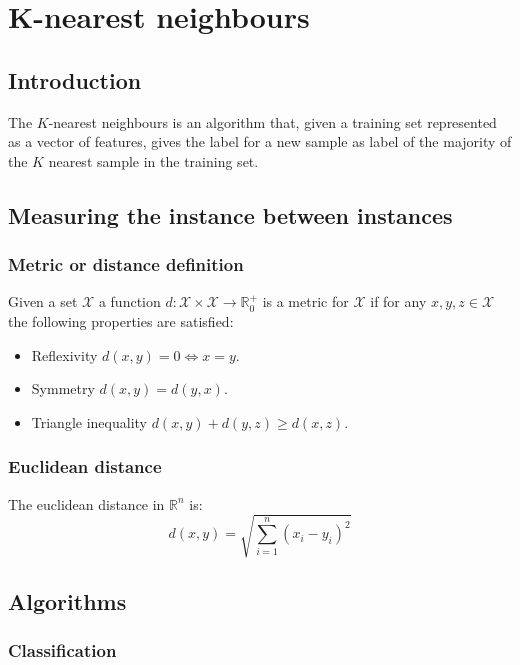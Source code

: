 \chapter{K-nearest neighbours}

\section{Introduction}
The $K$-nearest neighbours is an algorithm that, given a training set represented as a vector of features, gives the label for a new sample as label of the majority of the $K$ nearest sample in the training set.

\section{Measuring the instance between instances}

	\subsection{Metric or distance definition}
Given a set $\mathcal{X}$ a function $d:\mathcal{X}\times\mathcal{X}\rightarrow\mathbb{R}^{+}_0$ is a metric for $\mathcal{X}$ if for any $x,y,z\in \mathcal{X}$ the following properties are satisfied:
	\begin{itemize}
		\item Reflexivity $d(x,y) = 0 \Leftrightarrow x = y$.
		\item Symmetry $d(x,y) = d(y,x)$.
		\item Triangle inequality $d(x, y) + d(y, z) \ge d(x, z)$.
	\end{itemize}

	\subsection{Euclidean distance}
	The euclidean distance in $\mathbb{R}^n$ is:
	$$d(x,y) = \sqrt{\sum\limits_{i=1}^n(x_i-y_i)^2}$$

\section{Algorithms}

	\subsection{Classification}

		

